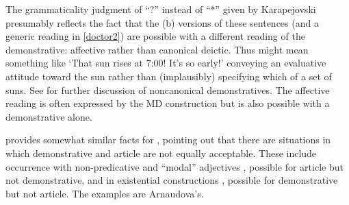 \documentclass[output=paper]{langscibook}
\begin{document}
\noindent The grammaticality judgment of ``?'' instead of ``*'' given by Karapejovski presumably reflects the fact that the (b) versions of these sentences (and a generic reading in \ref{doctor2}) are possible with a different reading of the demonstrative: affective rather than canonical deictic. Thus  might mean something like `That sun rises at 7:00! It's so early!' conveying an evaluative attitude toward the sun rather than (implausibly) specifying which of a set of suns. See  for further discussion of noncanonical demonstratives. The affective reading is often expressed by the MD construction but is also possible with a demonstrative alone.

\citet{Arnaudova1998} provides somewhat similar facts for , pointing out that there are situations in which demonstrative and article are not equally acceptable. These include occurrence with non-predicative and ``modal'' adjectives , possible for article but not demonstrative, and in existential constructions , possible for demonstrative but not article. The examples are Arnaudova's.



\ea \label{bother}
\z

\end{document}
